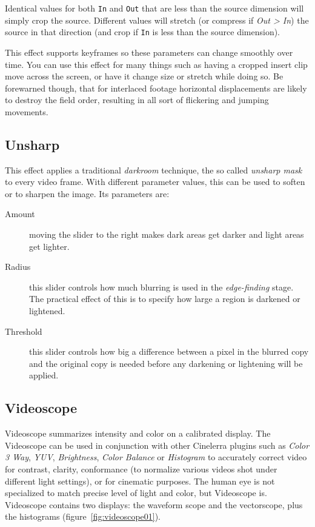 Identical values for both \texttt{In} and \texttt{Out} that are less than the source dimension will simply crop the source. Different values will stretch (or compress if \textit{Out > In}) the source in that direction (and crop if \texttt{In} is less than the source dimension).

This effect supports keyframes so these parameters can change smoothly over time. You can use this effect for many things such as having a cropped insert clip move across the screen, or have it change size or stretch while doing so. Be forewarned though, that for interlaced footage horizontal displacements are likely to destroy the field order, resulting in all sort of flickering and jumping movements.

\subsection{Unsharp}%
\label{sub:Unsharp}

This effect applies a traditional \textit{darkroom} technique, the so called \textit{unsharp mask} to every video frame. With different parameter values, this can be used to soften or to sharpen the image. Its parameters are:

\begin{description}
    \item[Amount] moving the slider to the right makes dark areas get darker and light areas get lighter.
    \item[Radius] this slider controls how much blurring is used in the \textit{edge-finding} stage. The practical effect of this is to specify how large a region is darkened or lightened.
    \item[Threshold] this slider controls how big a difference between a pixel in the blurred copy and the original copy is needed before any darkening or lightening will be applied.
\end{description}

\subsection{Videoscope}%
\label{sub:videoscope}

Videoscope summarizes intensity and color on a calibrated display. The Videoscope can be used in conjunction with other Cinelerra plugins such as \textit{Color 3 Way}, \textit{YUV}, \textit{Brightness}, \textit{Color Balance} or \textit{Histogram} to accurately correct video for contrast, clarity, conformance (to normalize various videos shot under different light settings), or for cinematic purposes. The human eye is not specialized to match precise level of light and color, but Videoscope is. Videoscope contains two displays: the waveform scope and the vectorscope, plus the histograms (figure~\ref{fig:videoscope01}).

